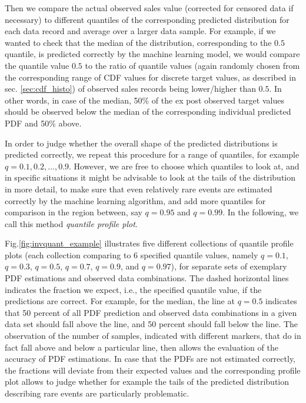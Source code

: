 \documentclass[BCOR=1mm, DIV=calc,10pt,
twoside=true,
twocolumn,
headings=normal]{scrartcl}
\newcommand{\fig}{Fig.}
\begin{document}
Then we compare the actual observed sales value (corrected for censored data if necessary) to different quantiles of the corresponding predicted distribution for each data record and average over a larger data sample. For example, if we wanted to check that the median of the distribution, corresponding to the $0.5$ quantile, is predicted correctly by the machine learning model, we would compare the quantile value $0.5$ to the ratio of quantile values (again randomly chosen from the corresponding range of CDF values for discrete target values, as described in sec. \ref{sec:cdf_histo}) of observed sales records being lower/higher than $0.5$. In other words, in case of the median, 50\% of the ex post observed target values should be observed below the median of the corresponding individual predicted PDF and 50\% above.

In order to judge whether the overall shape of the predicted distributions is predicted correctly, we repeat this procedure for a range of quantiles, for example $q = 0.1, 0.2, \ldots, 0.9$. However, we are free to choose which quantiles to look at, and in specific situations it might be advisable to look at the tails of the distribution in more detail, to make sure that even relatively rare events are estimated correctly by the machine learning algorithm, and add more quantiles for comparison in the region between, say $q = 0.95$ and $q = 0.99$. In the following, we call this method {\em quantile profile plot}.

\fig \ref{fig:invquant_example} illustrates five different collections of quantile profile plots (each collection comparing to 6 specified quantile values, namely $q = 0.1$, $q = 0.3$, $q = 0.5$, $q = 0.7$, $q = 0.9$, and $q = 0.97$), for separate sets of exemplary PDF estimations and observed data combinations. The dashed horizontal lines indicates the fraction we expect, i.e., the specified quantile value, if the predictions are correct. For example, for the median, the line at $q = 0.5$ indicates that  50 percent of all PDF prediction and observed data combinations in a given data set should fall above the line, and 50 percent should fall below the line. The observation of the number of samples, indicated with different markers, that do in fact fall above and below a particular line, then allows the evaluation of the accuracy of PDF estimations. In case that the PDFs are not estimated correctly, the fractions will deviate from their expected values and the corresponding profile plot allows to judge whether for example the tails of the predicted distribution describing rare events are particularly problematic.
\end{document}
